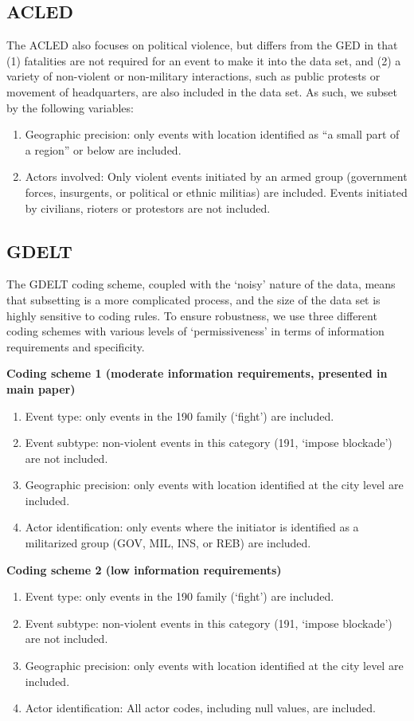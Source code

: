 \documentclass[hidelinks]{article}
\begin{document}
\subsection{ACLED}
The ACLED also focuses on political violence, but differs from the GED in that (1) fatalities are not required for an event to make it into the data set, and (2) a variety of non-violent or non-military interactions, such as public protests or movement of headquarters, are also included in the data set. As such, we subset by the following variables:
\begin{enumerate}
\item Geographic precision: only events with location identified as ``a small part of a region'' or below are included.
\item Actors involved: Only violent events initiated by an armed group (government forces, insurgents, or political or ethnic militias) are included. Events initiated by civilians, rioters or protestors are not included.
\end{enumerate}

\subsection{GDELT}
The GDELT coding scheme, coupled with the `noisy' nature of the data, means that subsetting is a more complicated process, and the size of the data set is highly sensitive to coding rules. To ensure robustness, we use three different coding schemes with various levels of `permissiveness' in terms of information requirements and specificity.

\textbf{Coding scheme 1 (moderate information requirements, presented in main paper)}
\begin{enumerate}
\item Event type: only events in the 190 family (`fight') are included.
\item Event subtype: non-violent events in this category (191, `impose blockade') are not included.
\item Geographic precision: only events with location identified at the city level are included.
\item Actor identification: only events where the initiator is identified as a militarized group (GOV, MIL, INS, or REB) are included.
\end{enumerate}

\textbf{Coding scheme 2 (low information requirements)}
\begin{enumerate}
\item Event type: only events in the 190 family (`fight') are included.
\item Event subtype: non-violent events in this category (191, `impose blockade') are not included.
\item Geographic precision: only events with location identified at the city level are included.
\item Actor identification: All actor codes, including null values, are included.
\end{enumerate}
\end{document}
